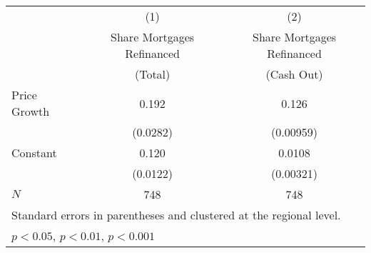 \begin{tabular}{l*{2}{c}}
\hline\hline
&\multicolumn{1}{c}{(1)}&\multicolumn{1}{c}{(2)}\\
& Share Mortgages Refinanced   & Share Mortgages Refinanced \\
& (Total) & (Cash Out) \\ 
\hline
Price Growth  &       0.192\sym{***}	&       0.126\sym{***}\\
            			&    (0.0282)         		&   (0.00959)         \\
Constant      	&       0.120\sym{***}	&      0.0108\sym{***}\\
            			&    (0.0122)         		&   (0.00321)         \\
\hline
\(N\)       		&   748         				&    748         \\
\hline\hline
\multicolumn{3}{l}{\footnotesize Standard errors in parentheses and clustered at the regional level.}\\
\multicolumn{3}{l}{\footnotesize \sym{*} \(p<0.05\), \sym{**} \(p<0.01\), \sym{***} \(p<0.001\)}\\
\end{tabular}

